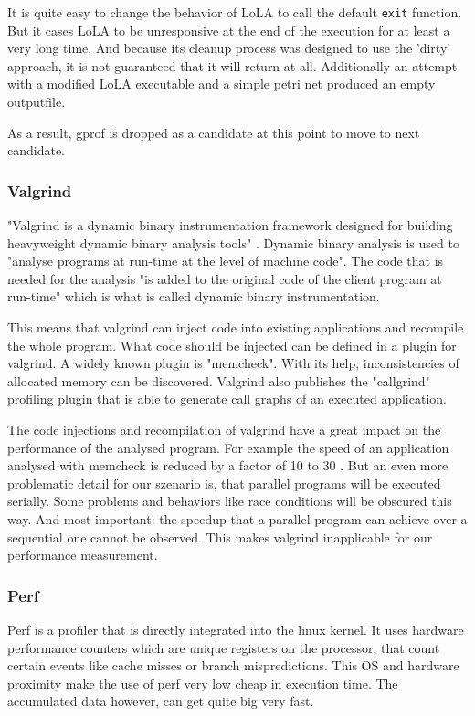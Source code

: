 It is quite easy to change the behavior of LoLA to call the default \texttt{exit} function. But it cases LoLA to be unresponsive at the end of the execution for at least a very long time. And because its cleanup process was designed to use the 'dirty' approach, it is not guaranteed that it will return at all. Additionally an attempt with a modified LoLA executable and a simple petri net produced an empty outputfile.

As a result, gprof is dropped as a candidate at this point to move to next candidate.

\subsubsection{Valgrind}
"Valgrind is a dynamic binary instrumentation framework designed for building heavyweight dynamic binary analysis tools" \cite{nethercote2007valgrind}. Dynamic binary analysis is used to "analyse programs at run-time at the level of machine code". The code that is needed for the analysis "is added to the original code of the client program at run-time" which is what is called dynamic binary instrumentation.

This means that valgrind can inject code into existing applications and recompile the whole program. What code should be injected can be defined in a plugin for valgrind. A widely known plugin is "memcheck". With its help, inconsistencies of allocated memory can be discovered. Valgrind also publishes the "callgrind" profiling plugin that is able to generate call graphs of an executed application.

The code injections and recompilation of valgrind have a great impact on the performance of the analysed program. For example the speed of an application analysed with memcheck is reduced by a factor of 10 to 30 \cite{valgrindTools}. But an even more problematic detail for our szenario is, that parallel programs will be executed serially. Some problems and behaviors like race conditions will be obscured this way. And most important: the speedup that a parallel program can achieve over a sequential one cannot be observed. This makes valgrind inapplicable for our performance measurement.

\subsubsection{Perf}
Perf is a profiler that is directly integrated into the linux kernel. It uses hardware performance counters which are unique registers on the processor, that count certain events like cache misses or branch mispredictions. This OS and hardware proximity make the use of perf very low cheap in execution time. The accumulated data however, can get quite big very fast.

